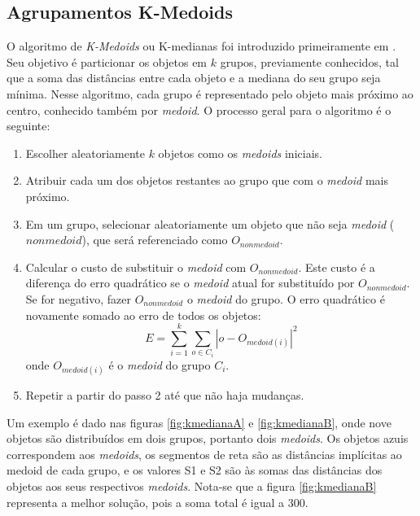 \subsection{Agrupamentos K-Medoids}
O algoritmo de \textit{K-Medoids} ou K-medianas foi introduzido primeiramente em \cite{kaufmann1990}. Seu objetivo é particionar os objetos em ${k}$ grupos, previamente conhecidos, tal que a soma das distâncias entre cada objeto e a mediana do seu grupo seja mínima. Nesse algoritmo, cada grupo é representado pelo objeto mais próximo ao centro, conhecido também por \textit{medoid}.
O processo geral para o algoritmo é o seguinte:
 \begin{enumerate}
 	\item Escolher aleatoriamente ${k}$ objetos como os \textit{medoids} iniciais.
 	\item Atribuir cada um dos objetos restantes ao grupo que com o \textit{medoid} mais próximo.
 	\item Em um grupo, selecionar aleatoriamente um objeto que não seja \textit{medoid} (${nonmedoid}$), que será referenciado como ${O_{nonmedoid}}$.
 	\item Calcular o custo de substituir o \textit{medoid} com ${O_{nonmedoid}}$. Este custo é a diferença do erro quadrático se o \textit{medoid} atual for substituído por ${O_{nonmedoid}}$. Se for negativo, fazer ${O_{nonmedoid}}$ o \textit{medoid} do grupo. O erro quadrático é novamente somado ao erro de todos os objetos:
 	\begin{equation}
 	E = \sum_{i=1}^{k}\sum_{o\in C_{i}} |o - O_{medoid(i)}|^{2}
 	\end{equation}
 	onde ${O_{medoid(i)}}$ é o \textit{medoid} do grupo ${C_{i}}$.
 	\item Repetir a partir do passo 2 até que não haja mudanças. 
 \end{enumerate}

Um exemplo é dado nas figuras \ref{fig:kmedianaA} e \ref{fig:kmedianaB}, onde nove objetos são distribuídos em dois grupos, portanto dois \textit{medoids}. Os objetos azuis correspondem aos \textit{medoids}, os segmentos de reta são as distâncias implícitas ao medoid de cada grupo, e os valores S1 e S2 são às somas das distâncias dos objetos aos seus respectivos \textit{medoids}. Nota-se que a figura \ref{fig:kmedianaB} representa a melhor solução, pois a soma total é igual a 300.

